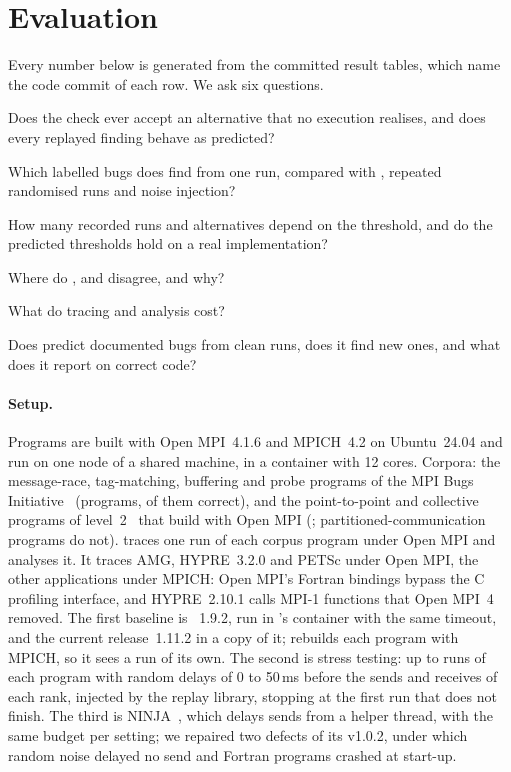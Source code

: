 \section{Evaluation}
\label{sec:eval}

Every number below is generated from the committed result tables, which name the code commit
of each row. We ask six questions.
\begin{description}[leftmargin=*]
\item[RQ1, soundness in practice.] Does the check ever accept an alternative that no
  execution realises, and does every replayed finding behave as predicted?
\item[RQ2, effectiveness.] Which labelled bugs does \tool find from one run, compared
  with \MUST, repeated randomised runs and noise injection?
\item[RQ3, buffering.] How many recorded runs and alternatives depend on the threshold,
  and do the predicted thresholds hold on a real implementation?
\item[RQ4, levels.] Where do \Lone, \LoneSP and \Ltwo disagree, and why?
\item[RQ5, cost.] What do tracing and analysis cost?
\item[RQ6, real applications.] Does \tool predict documented bugs from clean runs, does it
  find new ones, and what does it report on correct code?
\end{description}

\paragraph{Setup.} Programs are built with Open MPI~4.1.6 and MPICH~4.2 on Ubuntu~24.04
and run on one node of a shared machine, in a container with 12 cores. Corpora: the
message-race, tag-matching, buffering and probe programs of the MPI Bugs
Initiative~\citep{laurent21mbi} (\nMBIprogs programs, \nMBIcorrect of them correct), and the
point-to-point and collective programs of \MBB level~2~\citep{jammer24mbb} that build with
Open MPI (\nMBBprogs; \nMBBnotBuilt partitioned-communication programs do not). \tool traces
one run of each corpus program under Open MPI and analyses it. It traces AMG, HYPRE~3.2.0 and
PETSc under Open MPI, the other applications under MPICH: Open MPI's Fortran bindings bypass
the C profiling interface, and HYPRE~2.10.1 calls MPI-1 functions that Open MPI~4 removed. The first baseline is
\MUST~1.9.2, run in \MBB's container with the same timeout, and the current release~1.11.2
in a copy of it; \MUST rebuilds each program with MPICH, so it sees a run of its own. The
second is stress testing: up to \nMBIStressRuns runs of each program with random delays of 0
to 50\,ms before the sends and receives of each rank, injected by the replay library, stopping
at the first run that does not finish. The third is NINJA~\citep{sato17ninja}, which delays
sends from a helper thread, with the same budget per setting; we repaired two defects of its v1.0.2, under
which random noise delayed no send and Fortran programs crashed at start-up.

